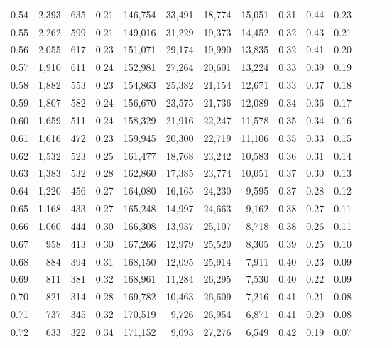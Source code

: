 \begin{tabular}{rrrrrrrrrrrrrr}
0.54 &  2,393 &  635 &  0.21 &  146,754 &   33,491 &  18,774 &  15,051 &  0.31 &  0.44 &      0.23 \\
0.55 &  2,262 &  599 &  0.21 &  149,016 &   31,229 &  19,373 &  14,452 &  0.32 &  0.43 &      0.21 \\
0.56 &  2,055 &  617 &  0.23 &  151,071 &   29,174 &  19,990 &  13,835 &  0.32 &  0.41 &      0.20 \\
0.57 &  1,910 &  611 &  0.24 &  152,981 &   27,264 &  20,601 &  13,224 &  0.33 &  0.39 &      0.19 \\
0.58 &  1,882 &  553 &  0.23 &  154,863 &   25,382 &  21,154 &  12,671 &  0.33 &  0.37 &      0.18 \\
0.59 &  1,807 &  582 &  0.24 &  156,670 &   23,575 &  21,736 &  12,089 &  0.34 &  0.36 &      0.17 \\
0.60 &  1,659 &  511 &  0.24 &  158,329 &   21,916 &  22,247 &  11,578 &  0.35 &  0.34 &      0.16 \\
0.61 &  1,616 &  472 &  0.23 &  159,945 &   20,300 &  22,719 &  11,106 &  0.35 &  0.33 &      0.15 \\
0.62 &  1,532 &  523 &  0.25 &  161,477 &   18,768 &  23,242 &  10,583 &  0.36 &  0.31 &      0.14 \\
0.63 &  1,383 &  532 &  0.28 &  162,860 &   17,385 &  23,774 &  10,051 &  0.37 &  0.30 &      0.13 \\
0.64 &  1,220 &  456 &  0.27 &  164,080 &   16,165 &  24,230 &   9,595 &  0.37 &  0.28 &      0.12 \\
0.65 &  1,168 &  433 &  0.27 &  165,248 &   14,997 &  24,663 &   9,162 &  0.38 &  0.27 &      0.11 \\
0.66 &  1,060 &  444 &  0.30 &  166,308 &   13,937 &  25,107 &   8,718 &  0.38 &  0.26 &      0.11 \\
0.67 &    958 &  413 &  0.30 &  167,266 &   12,979 &  25,520 &   8,305 &  0.39 &  0.25 &      0.10 \\
0.68 &    884 &  394 &  0.31 &  168,150 &   12,095 &  25,914 &   7,911 &  0.40 &  0.23 &      0.09 \\
0.69 &    811 &  381 &  0.32 &  168,961 &   11,284 &  26,295 &   7,530 &  0.40 &  0.22 &      0.09 \\
0.70 &    821 &  314 &  0.28 &  169,782 &   10,463 &  26,609 &   7,216 &  0.41 &  0.21 &      0.08 \\
0.71 &    737 &  345 &  0.32 &  170,519 &    9,726 &  26,954 &   6,871 &  0.41 &  0.20 &      0.08 \\
0.72 &    633 &  322 &  0.34 &  171,152 &    9,093 &  27,276 &   6,549 &  0.42 &  0.19 &      0.07 \\

\end{tabular}
